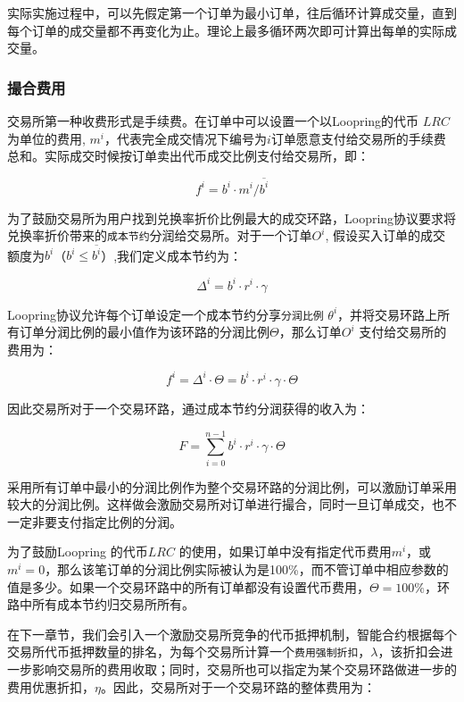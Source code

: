 \documentclass[UTF8,nofonts]{ctexart}
\begin{document}
实际实施过程中，可以先假定第一个订单为最小订单，往后循环计算成交量，直到每个订单的成交量都不再变化为止。理论上最多循环两次即可计算出每单的实际成交量。

\subsubsection{撮合费用\label{sec:fee}}

交易所第一种收费形式是手续费。在订单中可以设置一个以Loopring的代币 $LRC$为单位的费用, $m^i$，代表完全成交情况下编号为$i$订单愿意支付给交易所的手续费总和。实际成交时候按订单卖出代币成交比例支付给交易所，即：

\begin{equation*}
f^i = b^i \cdot m^i  / \overline{b^i}
\end{equation*}


为了鼓励交易所为用户找到兑换率折价比例最大的成交环路，Loopring协议要求将兑换率折价带来的\texttt{成本节约}分润给交易所。对于一个订单$O^i$, 假设买入订单的成交额度为$b^i$（$b^i \le \overline{b^i}$）,我们定义成本节约为：

\begin{equation*}
\Delta^i = b^i \cdot r^i \cdot \gamma
\end{equation*}

Loopring协议允许每个订单设定一个成本节约分享\texttt{分润比例} $\theta^i$，并将交易环路上所有订单分润比例的最小值作为该环路的分润比例$\Theta$，那么订单$O^i$ 支付给交易所的费用为：


\begin{equation*}
f^i = \Delta^i \cdot \Theta = b^i \cdot r^i \cdot \gamma \cdot \Theta
\end{equation*}

因此交易所对于一个交易环路，通过成本节约分润获得的收入为：

\begin{equation*}
F = \sum^{n-1}_{i=0} b^i \cdot r^i \cdot \gamma \cdot \Theta
\end{equation*}

采用所有订单中最小的分润比例作为整个交易环路的分润比例，可以激励订单采用较大的分润比例。这样做会激励交易所对订单进行撮合，同时一旦订单成交，也不一定非要支付指定比例的分润。


为了鼓励Loopring 的代币$LRC$ 的使用，如果订单中没有指定代币费用$m^i$，或$m^i=0$，那么该笔订单的分润比例实际被认为是100\%，而不管订单中相应参数的值是多少。如果一个交易环路中的所有订单都没有设置代币费用，$\Theta=100\%$，环路中所有成本节约归交易所所有。


在下一章节，我们会引入一个激励交易所竞争的代币抵押机制，智能合约根据每个交易所代币抵押数量的排名，为每个交易所计算一个\texttt{费用强制折扣}，$\lambda$，该折扣会进一步影响交易所的费用收取；同时，交易所也可以指定为某个交易环路做进一步的费用优惠折扣，$\eta$。因此，交易所对于一个交易环路的整体费用为：
\end{document}
